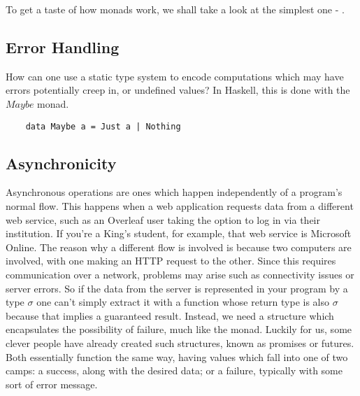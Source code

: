 To get a taste of how monads work, we shall take a look at the simplest one - .
\subsection{Error Handling}
How can one use a static type system to encode computations which may have errors potentially creep in, or undefined values? In Haskell, this is done with the $Maybe$ monad.
\begin{lstlisting}
    data Maybe a = Just a | Nothing
\end{lstlisting}
\subsection{Asynchronicity}
Asynchronous operations are ones which happen independently of a program's normal flow. This happens when a web application requests data from a different web service, such as an Overleaf user taking the option to log in via their institution. If you're a King's student, for example, that web service is Microsoft Online.
The reason why a different flow is involved is because two computers are involved, with one making an HTTP request to the other. Since this requires communication over a network, problems may arise such as connectivity issues or server errors.
So if the data from the server is represented in your program by a type $\sigma$ one can't simply extract it with a function whose return type is also $\sigma$ because that implies a guaranteed result. Instead, we need a structure which encapsulates the possibility of failure, much like the  monad. Luckily for us, some clever people have already created such structures, known as promises or futures. Both essentially function the same way, having values which fall into one of two camps: a success, along with the desired data; or a failure, typically with some sort of error message.

